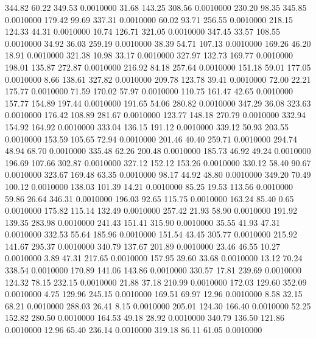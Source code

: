  344.82   60.22  349.53   0.0010000
  31.68  143.25  308.56   0.0010000
 230.20   98.35  345.85   0.0010000
 179.42   99.69  337.31   0.0010000
  60.02   93.71  256.55   0.0010000
 218.15  124.33   44.31   0.0010000
  10.74  126.71  321.05   0.0010000
 347.45   33.57  108.55   0.0010000
  34.92   36.03  259.19   0.0010000
  38.39   54.71  107.13   0.0010000
 169.26   46.20   18.91   0.0010000
 321.38   10.98   33.17   0.0010000
 327.97  132.73  169.77   0.0010000
 198.01  135.87  272.87   0.0010000
 216.92   84.18  257.64   0.0010000
 151.18   59.01  177.05   0.0010000
   8.66  138.61  327.82   0.0010000
 209.78  123.78   39.41   0.0010000
  72.00   22.21  175.77   0.0010000
  71.59  170.02   57.97   0.0010000
 110.75  161.47   42.65   0.0010000
 157.77  154.89  197.44   0.0010000
 191.65   54.06  280.82   0.0010000
 347.29   36.08  323.63   0.0010000
 176.42  108.89  281.67   0.0010000
 123.77  148.18  270.79   0.0010000
 332.94  154.92  164.92   0.0010000
 333.04  136.15  191.12   0.0010000
 339.12   50.93  203.55   0.0010000
 153.59  105.65   72.94   0.0010000
 201.46   40.40  259.71   0.0010000
 294.74   48.94   68.70   0.0010000
 335.48   62.26  200.48   0.0010000
 185.73   46.92   49.24   0.0010000
 196.69  107.66  302.87   0.0010000
 327.12  152.12  153.26   0.0010000
 330.12   58.40   90.67   0.0010000
 323.67  169.48   63.35   0.0010000
  98.17   44.92   48.80   0.0010000
 349.20   70.49  100.12   0.0010000
 138.03  101.39   14.21   0.0010000
  85.25   19.53  113.56   0.0010000
  59.86   26.64  346.31   0.0010000
 196.03   92.65  115.75   0.0010000
 163.24   85.40    0.65   0.0010000
 175.82  115.14  132.49   0.0010000
 257.42   21.93   58.90   0.0010000
 191.92  139.35  283.98   0.0010000
 241.43  151.41  315.90   0.0010000
  35.55   41.93   47.31   0.0010000
 332.53   55.64  185.96   0.0010000
 151.54   43.45  305.77   0.0010000
 215.92  141.67  295.37   0.0010000
 340.79  137.67  201.89   0.0010000
  23.46   46.55   10.27   0.0010000
   3.89   47.31  217.65   0.0010000
 157.95   39.60   33.68   0.0010000
  13.12   70.24  338.54   0.0010000
 170.89  141.06  143.86   0.0010000
 330.57   17.81  239.69   0.0010000
 124.32   78.15  232.15   0.0010000
  21.88   37.18  210.99   0.0010000
 172.03  129.60  352.09   0.0010000
   4.75  129.96  245.15   0.0010000
 169.51   69.97   12.96   0.0010000
   8.58   32.15   68.21   0.0010000
 288.03   26.41    8.15   0.0010000
 205.01  124.30  166.40   0.0010000
  52.25  152.82  280.50   0.0010000
 164.53   49.18   28.92   0.0010000
 340.79  136.50  121.86   0.0010000
  12.96   65.40  236.14   0.0010000
 319.18   86.11   61.05   0.0010000
